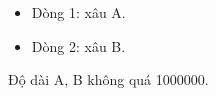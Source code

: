 \begin{itemize}
	\item Dòng 1: xâu A.
	\item Dòng 2: xâu B.
\end{itemize}

Độ dài A, B không quá 1000000.